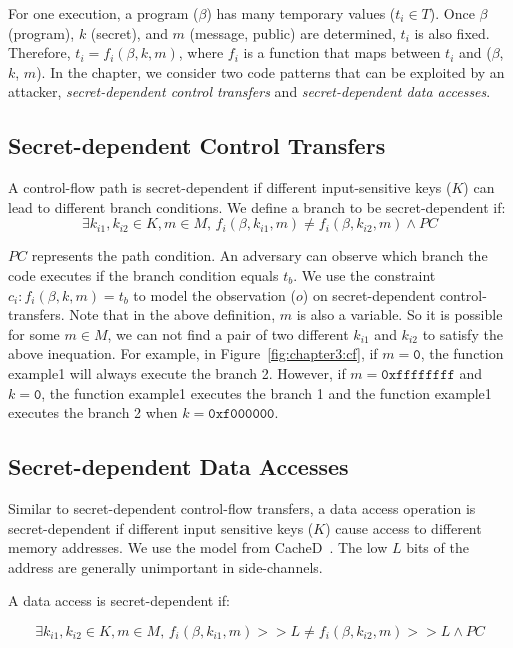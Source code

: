 For one execution, a program ($\beta$) has many temporary values ($t_i \in
  T$). Once $\beta$ (program), $k$ (secret), and $m$ (message, public) are
determined, $t_i$ is also fixed. Therefore, $ t_i = f_i(\beta, k, m)$, where $f_
  i$ is a function that maps between $t_i$ and ($\beta$, $k$, $m$). In the chapter,
we consider two code patterns that can be exploited by an attacker,
\emph{secret-dependent control transfers} and \emph{secret-dependent data
  accesses}. 

\subsection{Secret-dependent Control Transfers}
A control-flow path is secret-dependent if different input-sensitive keys
($K$) can lead to different branch conditions.
We define a branch to be secret-dependent if:
$$\exists k_{i1}, k_{i2} \in K, m \in M, \,f_i(\beta, k_{i1}, m) \neq f_i(\beta, k_{i2}, m) \land PC$$

$PC$ represents the path condition. An adversary can observe which branch the code executes if the branch condition
equals $t_b$. We use the constraint $c_i : f_i(\beta, k, m) = t_b$ to model
the observation ($o$) on secret-dependent control-transfers. Note that in the
above definition, $m$ is also a variable. So it is possible for some $m \in M$,
we can not find a pair of two different $k_{i1}$ and $k_{i2}$ to satisfy the above inequation. For example, in Figure~\ref{fig:chapter3:cf}, if $m = \mathtt{0}$, the function \textsf{example1} will always execute the branch 2. However, if $m = \mathtt{0xffffffff}$ and $k = \mathtt{0}$, the function \textsf{example1} executes the branch 1 and the function \textsf{example1} executes the branch 2 when $k = \mathtt{0xf000000}$.


\subsection{Secret-dependent Data Accesses}
Similar to secret-dependent control-flow transfers, a data access operation is
secret-dependent if different input sensitive keys ($K$) cause access to different memory addresses. We use the model from CacheD~\cite{203878}. The low $L$ bits of the address are generally unimportant in side-channels.

A data access is secret-dependent if:

$$\exists k_{i1}, k_{i2} \in K, m \in M,\,f_i(\beta, k_{i1}, m) >> L \neq f_i(\beta, k_{i2}, m) >> L \land PC$$

